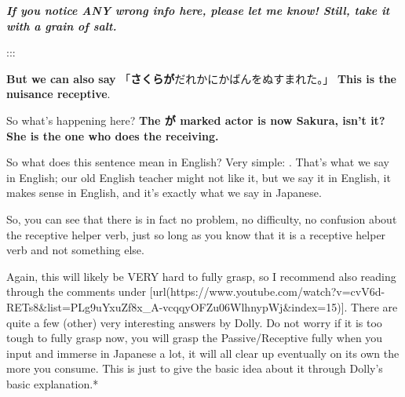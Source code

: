 {\bf {\em If you notice ANY wrong info here, please let me know! Still, take it with a grain of salt.}}

:::

\startsectionlevel[title={The Suffering Passive / Nuisance Receptive example},reference={the-suffering-passive-nuisance-receptive-example}]

{\bf But we can also say} 「{\bf さくらが}だれかにかばんをぬすまれた。」 {\bf This is the nuisance receptive}.

{}

So what's happening here? {\bf The が marked actor is now Sakura, isn't it? She is the one who does the receiving.}

{}

So what does this sentence mean in English? Very simple: . That's what we say in English; our old English teacher might not like it, but we say it in English, it makes sense in English, and it's exactly what we say in Japanese. 

So, you can see that there is in fact no problem, no difficulty, no confusion about the receptive helper verb, just so long as you know that it is a receptive helper verb and not something else.

Again, this will likely be VERY hard to fully grasp, so I recommend also reading through the comments under [url(https://www.youtube.com/watch?v=cvV6d-RETs8&list=PLg9uYxuZf8x_A-vcqqyOFZu06WlhnypWj&index=15)]. There are quite a few (other) very interesting answers by Dolly.\crlf
Do not worry if it is too tough to fully grasp now, you will grasp the Passive/Receptive fully when you input and immerse in Japanese a lot, it will all clear up eventually on its own the more you consume. This is just to give the basic idea about it through Dolly's basic explanation.*

\stopsectionlevel

\stopsectionlevel

\stopsectionlevel
